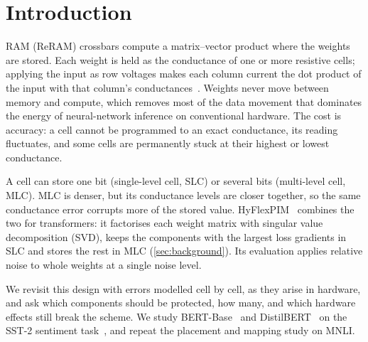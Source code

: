 \section{Introduction}\label{sec:intro}

 RAM (ReRAM) crossbars compute a matrix--vector product where the weights are
stored. Each weight is held as the conductance of one or more resistive cells; applying the input as
row voltages makes each column current the dot product of the input with that column's
conductances~\cite{shafiee2016isaac,chi2016prime}. Weights never move between memory and compute, which
removes most of the data movement that dominates the energy of neural-network inference on conventional
hardware. The cost is accuracy: a cell cannot be programmed to an exact conductance, its reading
fluctuates, and some cells are permanently stuck at their highest or lowest conductance.

A cell can store one bit (single-level cell, SLC) or several bits (multi-level cell, MLC). MLC is denser,
but its conductance levels are closer together, so the same conductance error corrupts more of the stored
value. HyFlexPIM~\cite{song2025hyflexpim} combines the two for transformers: it factorises each weight
matrix with singular value decomposition (SVD), keeps the components with the largest loss gradients in
SLC and stores the rest in MLC (\cref{sec:background}). Its evaluation applies relative noise to whole
weights at a single noise level.

We revisit this design with errors modelled cell by cell, as they arise in hardware, and ask which
components should be protected, how many, and which hardware effects still break the scheme. We study
BERT-Base~\cite{devlin2019bert} and DistilBERT~\cite{sanh2019distilbert} on the SST-2 sentiment
task~\cite{socher2013sst,wang2019glue}, and repeat the placement and mapping study on MNLI.

